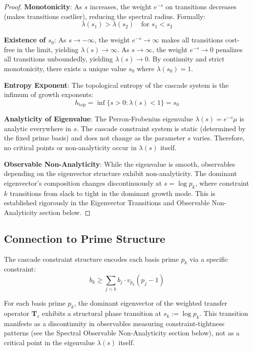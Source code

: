 \begin{proof}

\noindent \textbf{Monotonicity}: As $s$ increases, the weight $e^{-s}$ on transitions decreases (makes transitions costlier), reducing the spectral radius. Formally:
\begin{equation}
\lambda(s_1) > \lambda(s_2) \quad \text{for } s_1 < s_2
\end{equation}

\noindent \textbf{Existence of $s_0$}: As $s \to -\infty$, the weight $e^{-s} \to \infty$ makes all transitions cost-free in the limit, yielding $\lambda(s) \to \infty$. As $s \to \infty$, the weight $e^{-s} \to 0$ penalizes all transitions unboundedly, yielding $\lambda(s) \to 0$. By continuity and strict monotonicity, there exists a unique value $s_0$ where $\lambda(s_0) = 1$.

\noindent \textbf{Entropy Exponent}: The topological entropy of the cascade system is the infimum of growth exponents:
\begin{equation}
h_{\text{top}} = \inf\{s > 0 : \lambda(s) < 1\} = s_0
\end{equation}

\noindent \textbf{Analyticity of Eigenvalue}: The Perron-Frobenius eigenvalue $\lambda(s) = e^{-s} \mu$ is analytic everywhere in $s$. The cascade constraint system is static (determined by the fixed prime basis) and does not change as the parameter $s$ varies. Therefore, no critical points or non-analyticity occur in $\lambda(s)$ itself.

\noindent \textbf{Observable Non-Analyticity}: While the eigenvalue is smooth, observables depending on the eigenvector structure exhibit non-analyticity. The dominant eigenvector's composition changes discontinuously at $s = \log p_k$, where constraint $k$ transitions from slack to tight in the dominant growth mode. This is established rigorously in the Eigenvector Transitions and Observable Non-Analyticity section below.

\end{proof}

\subsection{Connection to Prime Structure}
\label{subsec:primes-critical-points}

\begin{proposition}
\label{prop:cascade-primes-encoding}
The cascade constraint structure encodes each basis prime $p_k$ via a specific constraint:
\begin{equation}
b_k \geq \sum_{j < k} b_j \cdot v_{p_k}(p_j - 1)
\end{equation}

For each basis prime $p_k$, the dominant eigenvector of the weighted transfer operator $\mathbf{T}_s$ exhibits a structural phase transition at $s_k := \log p_k$. This transition manifests as a discontinuity in observables measuring constraint-tightness patterns (see the Spectral Observable Non-Analyticity section below), not as a critical point in the eigenvalue $\lambda(s)$ itself.
\end{proposition}

